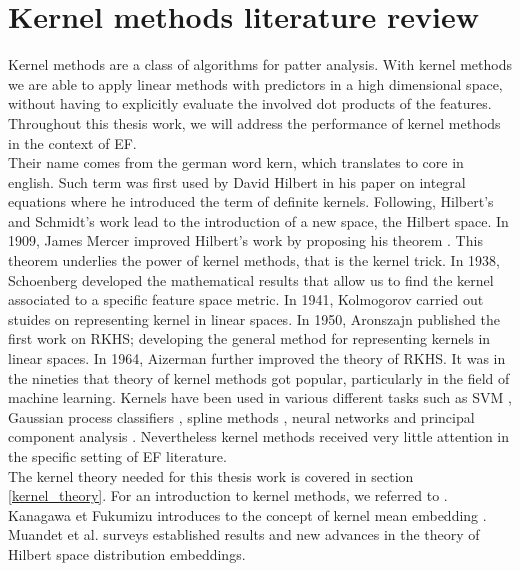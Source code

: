 \section{Kernel methods literature review}
Kernel methods are a class of algorithms for patter analysis.
With kernel methods we are able to apply linear methods with predictors in a high dimensional space, without having to explicitly evaluate the involved dot products of the features.
Throughout this thesis work, we will address the performance of kernel methods in the context of EF.
\\
Their name comes from the german word kern, which translates to core in english. Such term was first used by David Hilbert in his paper on integral equations \cite{hilbert} where he introduced the term of definite kernels. Following, Hilbert's and Schmidt's \cite{schmidt} work lead to the introduction of a new space, the Hilbert space.
In 1909, James Mercer improved Hilbert's work by proposing his theorem \cite{mercer}. This theorem underlies the power of kernel methods, that is the kernel trick.
In 1938, Schoenberg \cite{schoenberg} developed the mathematical results that allow us to find the kernel associated to a specific feature space metric.
In 1941, Kolmogorov \cite{kolmogorov} carried out stuides on representing kernel in linear spaces.
In 1950, Aronszajn \cite{aronszajn} published the first work on RKHS; developing the general method for representing kernels in linear spaces.
In 1964, Aizerman \cite{aizerman} further improved the theory of RKHS.
It was in the nineties that theory of kernel methods got popular, particularly in the field of machine learning. Kernels have been used in various different tasks such as SVM \cite{vapnik1} \cite{vapnik2}, Gaussian process classifiers \cite{williams}, spline methods \cite{wahba}, neural networks \cite{poggio} and principal component analysis \cite{pca_scholkopf}.
Nevertheless kernel methods received very little attention in the specific setting of EF literature.
\\
The kernel theory needed for this thesis work is covered in section \ref{kernel_theory}. 
For an introduction to kernel methods, we referred to \cite{learning_with_kernels} \cite{hofmann2006review}.
\\
Kanagawa et Fukumizu introduces to the concept of kernel mean embedding \cite{pmlr}. Muandet et al. \cite{Muandet_2017} surveys established results and new advances in the theory of Hilbert space distribution embeddings. 

